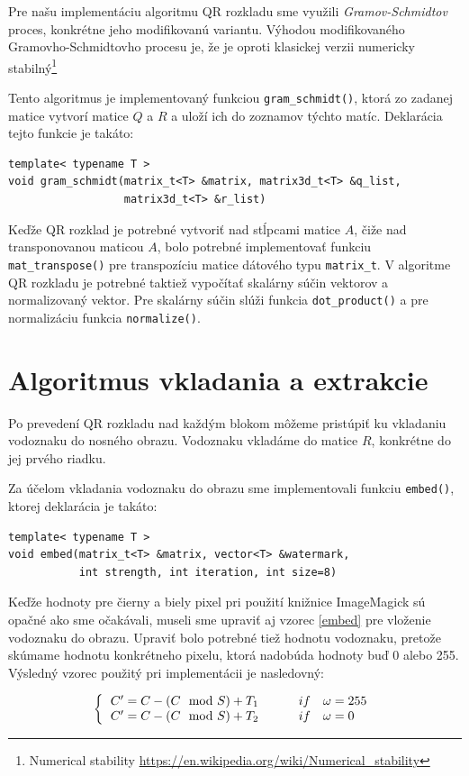 Pre našu implementáciu algoritmu QR rozkladu sme využili {\it Gramov-Schmidtov} proces, konkrétne jeho modifikovanú variantu. Výhodou modifikovaného Gramovho-Schmidtovho procesu je, že je oproti klasickej verzii numericky stabilný\footnote{Numerical stability \url{https://en.wikipedia.org/wiki/Numerical_stability}} 

Tento algoritmus je implementovaný funkciou {\tt gram\_schmidt()}, ktorá zo zadanej matice vytvorí matice $Q$ a $R$ a uloží ich do zoznamov týchto matíc. Deklarácia tejto funkcie je takáto:
\begin{lstlisting}
template< typename T >
void gram_schmidt(matrix_t<T> &matrix, matrix3d_t<T> &q_list,
                  matrix3d_t<T> &r_list)
\end{lstlisting}

Keďže QR rozklad je potrebné vytvoriť nad stĺpcami matice $A$, čiže nad transponovanou maticou $A$, bolo potrebné implementovať funkciu {\tt mat\_transpose()} pre transpozíciu matice dátového typu {\tt matrix\_t}. V algoritme QR rozkladu je potrebné taktiež vypočítať skalárny súčin vektorov a normalizovaný vektor. Pre skalárny súčin slúži funkcia {\tt dot\_product()} a pre normalizáciu funkcia {\tt normalize()}.
\clearpage
\section{Algoritmus vkladania a extrakcie}
\label{impl:embed-extract}
Po prevedení QR rozkladu nad každým blokom môžeme pristúpiť ku vkladaniu vodoznaku do nosného obrazu. Vodoznaku vkladáme do matice $R$, konkrétne do jej prvého riadku.

Za účelom vkladania vodoznaku do obrazu sme implementovali funkciu {\tt embed()}, ktorej deklarácia je takáto:
\begin{lstlisting}
template< typename T >
void embed(matrix_t<T> &matrix, vector<T> &watermark,
           int strength, int iteration, int size=8)
\end{lstlisting}

Keďže hodnoty pre čierny a biely pixel pri použití knižnice ImageMagick sú opačné ako sme očakávali, museli sme upraviť aj vzorec \ref{embed} pre vloženie vodoznaku do obrazu. Upraviť bolo potrebné tiež hodnotu vodoznaku, pretože skúmame hodnotu konkrétneho pixelu, ktorá nadobúda hodnoty buď 0 alebo 255. Výsledný vzorec použitý pri implementácii je nasledovný:

\begin{equation} \label{embed-mod}
\left \{
  \begin{tabular}{ll}
  $C' = C - (C\mod S) + T_1 \qquad$ & $if \quad \omega = 255$ \\
  $C' = C - (C\mod S) + T_2 \qquad$ & $if \quad \omega = 0$
  \end{tabular}
\right.
\end{equation}

